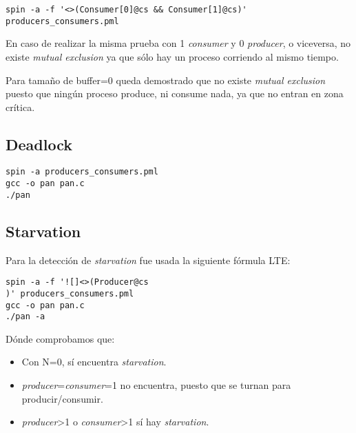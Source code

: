 \documentclass[a4paper,12pt]{article}
\begin{document}
\begin{lstlisting}
spin -a -f '<>(Consumer[0]@cs && Consumer[1]@cs)' 
producers_consumers.pml
\end{lstlisting}

En caso de realizar la misma prueba con 1 \textit{consumer} y 0 \textit{producer}, o viceversa, no existe \textit{mutual exclusion} ya que sólo hay un proceso corriendo al mismo tiempo.

Para tamaño de buffer=0 queda demostrado que no existe \textit{mutual exclusion} puesto que ningún proceso produce, ni consume nada, ya que no entran en zona crítica.

\subsection{Deadlock}

\begin{lstlisting}
spin -a producers_consumers.pml
gcc -o pan pan.c 
./pan
\end{lstlisting}

\subsection{Starvation}

Para la detección de \textit{starvation} fue usada la siguiente fórmula LTE: 

\begin{lstlisting}
spin -a -f '![]<>(Producer@cs
)' producers_consumers.pml
gcc -o pan pan.c
./pan -a
\end{lstlisting}

Dónde comprobamos que:

\begin{itemize}
\item Con N=0, sí encuentra \textit{starvation}.
\item \textit{producer}=\textit{consumer}=1 no encuentra, puesto que se turnan para producir/consumir.
\item \textit{producer}\textgreater 1 o \textit{consumer}\textgreater 1 sí hay \textit{starvation}.
\end{itemize}
\end{document}
